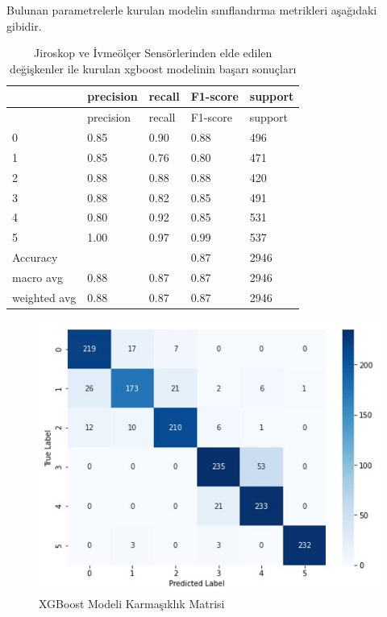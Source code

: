 \documentclass[12pt,twoside]{deuthesis}
\begin{document}
Bulunan parametrelerle kurulan modelin sınıflandırma metrikleri aşağıdaki gibidir.
\begin{longtable}[]{@{}lllll@{}}
\caption{\label{tab:jixgboost} Jiroskop ve İvmeölçer Sensörlerinden elde edilen değişkenler ile kurulan xgboost modelinin başarı sonuçları}\tabularnewline
\toprule()
& precision & recall & F1-score & support \\
\midrule()
\endfirsthead
\toprule()
& precision & recall & F1-score & support \\
\midrule()
\endhead
0 & 0.85 & 0.90 & 0.88 & 496 \\
1 & 0.85 & 0.76 & 0.80 & 471 \\
2 & 0.88 & 0.88 & 0.88 & 420 \\
3 & 0.88 & 0.82 & 0.85 & 491 \\
4 & 0.80 & 0.92 & 0.85 & 531 \\
5 & 1.00 & 0.97 & 0.99 & 537 \\
Accuracy & & & 0.87 & 2946 \\
macro avg & 0.88 & 0.87 & 0.87 & 2946 \\
weighted avg & 0.88 & 0.87 & 0.87 & 2946 \\
\bottomrule()
\end{longtable}
\begin{figure}

{\centering \includegraphics[width=0.9\linewidth,height=0.35\textheight]{figure/jixgboost_confmat} 

}

\caption{XGBoost Modeli Karmaşıklık Matrisi}\label{fig:jixgboostconfmat}
\end{figure}
\end{document}
